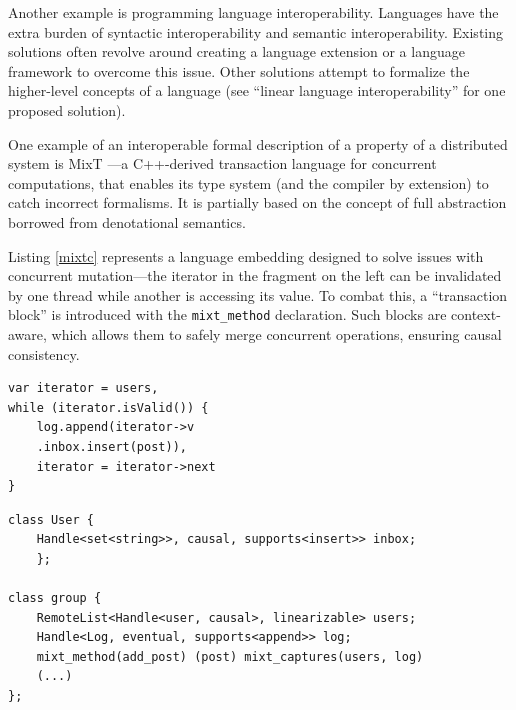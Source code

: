 \documentclass{article}
\begin{document}
Another example is programming language interoperability. Languages have the extra
burden of syntactic interoperability and semantic interoperability. Existing solutions often revolve
around creating a language extension or a language framework to overcome this issue. Other
solutions attempt to formalize the higher-level concepts of a language (see “linear language
interoperability” \cite{Scherer} for one proposed solution).

One example of an interoperable formal description of a property of a distributed system
is MixT \cite{Milano}---a C++-derived transaction language for concurrent computations, that enables its
type system (and the compiler by extension) to catch incorrect formalisms. It is partially based on
the concept of full abstraction borrowed from denotational semantics.

Listing \ref{mixtc} represents a language embedding designed to solve issues with concurrent mutation---the iterator in the fragment on the left can be invalidated by one thread while another is accessing its value. To combat this, a “transaction block” is introduced with the \lstinline{mixt_method} declaration. Such blocks are context-aware, which allows them to safely merge concurrent operations, ensuring
causal consistency.
    
\noindent\begin{minipage}[h]{.35\textwidth}
    \begin{lstlisting}[basicstyle=\footnotesize,
            stringstyle=\ttfamily,
            language={[ISO]C++}, frame=single,
            abovecaptionskip=\smallskipamount,
            title=(a) Unsafe C++ code, label=mixtl]
var iterator = users, 
while (iterator.isValid()) {
    log.append(iterator->v
    .inbox.insert(post)),
    iterator = iterator->next
}
    \end{lstlisting}
\end{minipage}\hfill
\begin{minipage}[h]{.63\textwidth}
    \begin{lstlisting}[basicstyle=\footnotesize,
                stringstyle=\ttfamily,
                language={[ISO]C++}, frame=single,
                abovecaptionskip=\smallskipamount,
                title=(b) Code embedded within a MixT structure, label=mixtr]
class User {
    Handle<set<string>>, causal, supports<insert>> inbox;
    };
    
class group {
    RemoteList<Handle<user, causal>, linearizable> users;
    Handle<Log, eventual, supports<append>> log;
    mixt_method(add_post) (post) mixt_captures(users, log) 
    (...)
};
    \end{lstlisting}
\end{minipage}
\end{document}
